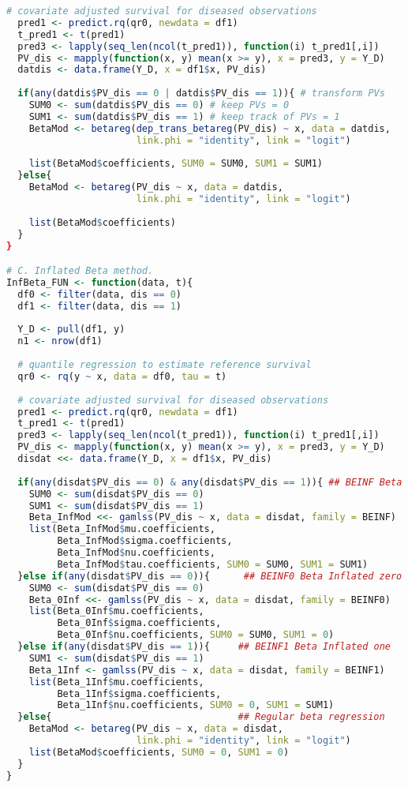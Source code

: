 \documentclass{article}
\begin{document}
\begin{lstlisting}[language=R]
  # covariate adjusted survival for diseased observations
  pred1 <- predict.rq(qr0, newdata = df1)
  t_pred1 <- t(pred1)
  pred3 <- lapply(seq_len(ncol(t_pred1)), function(i) t_pred1[,i])
  PV_dis <- mapply(function(x, y) mean(x >= y), x = pred3, y = Y_D) 
  datdis <- data.frame(Y_D, x = df1$x, PV_dis)
  
  if(any(datdis$PV_dis == 0 | datdis$PV_dis == 1)){ # transform PVs
    SUM0 <- sum(datdis$PV_dis == 0) # keep PVs = 0
    SUM1 <- sum(datdis$PV_dis == 1) # keep track of PVs = 1
    BetaMod <- betareg(dep_trans_betareg(PV_dis) ~ x, data = datdis,
                       link.phi = "identity", link = "logit")
    
    list(BetaMod$coefficients, SUM0 = SUM0, SUM1 = SUM1)
  }else{
    BetaMod <- betareg(PV_dis ~ x, data = datdis,
                       link.phi = "identity", link = "logit")
    
    list(BetaMod$coefficients)
  }
}

# C. Inflated Beta method.
InfBeta_FUN <- function(data, t){
  df0 <- filter(data, dis == 0)
  df1 <- filter(data, dis == 1)
  
  Y_D <- pull(df1, y)
  n1 <- nrow(df1)
  
  # quantile regression to estimate reference survival
  qr0 <- rq(y ~ x, data = df0, tau = t) 
  
  # covariate adjusted survival for diseased observations
  pred1 <- predict.rq(qr0, newdata = df1)
  t_pred1 <- t(pred1)
  pred3 <- lapply(seq_len(ncol(t_pred1)), function(i) t_pred1[,i])
  PV_dis <- mapply(function(x, y) mean(x >= y), x = pred3, y = Y_D) 
  disdat <<- data.frame(Y_D, x = df1$x, PV_dis)
  
  if(any(disdat$PV_dis == 0) & any(disdat$PV_dis == 1)){ ## BEINF Beta Inflated
    SUM0 <- sum(disdat$PV_dis == 0)
    SUM1 <- sum(disdat$PV_dis == 1)
    Beta_InfMod <<- gamlss(PV_dis ~ x, data = disdat, family = BEINF)
    list(Beta_InfMod$mu.coefficients,
         Beta_InfMod$sigma.coefficients,
         Beta_InfMod$nu.coefficients,
         Beta_InfMod$tau.coefficients, SUM0 = SUM0, SUM1 = SUM1)
  }else if(any(disdat$PV_dis == 0)){      ## BEINF0 Beta Inflated zero
    SUM0 <- sum(disdat$PV_dis == 0)
    Beta_0Inf <<- gamlss(PV_dis ~ x, data = disdat, family = BEINF0)
    list(Beta_0Inf$mu.coefficients,
         Beta_0Inf$sigma.coefficients,
         Beta_0Inf$nu.coefficients, SUM0 = SUM0, SUM1 = 0)
  }else if(any(disdat$PV_dis == 1)){     ## BEINF1 Beta Inflated one
    SUM1 <- sum(disdat$PV_dis == 1)
    Beta_1Inf <- gamlss(PV_dis ~ x, data = disdat, family = BEINF1)
    list(Beta_1Inf$mu.coefficients,
         Beta_1Inf$sigma.coefficients,
         Beta_1Inf$nu.coefficients, SUM0 = 0, SUM1 = SUM1)
  }else{                                 ## Regular beta regression
    BetaMod <- betareg(PV_dis ~ x, data = disdat,
                       link.phi = "identity", link = "logit")
    list(BetaMod$coefficients, SUM0 = 0, SUM1 = 0)
  }
}


\end{lstlisting}
\end{document}
